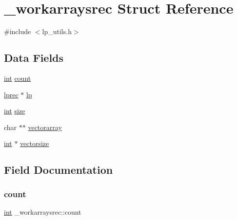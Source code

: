 \hypertarget{struct__workarraysrec}{}\section{\+\_\+workarraysrec Struct Reference}
\label{struct__workarraysrec}


{\ttfamily \#include $<$lp\+\_\+utils.\+h$>$}

\subsection*{Data Fields}
\begin{DoxyCompactItemize}
\item 
\hyperlink{lp__lib_8h_adeb9ec6400320e4923ac9d836d509ddb}{int} \hyperlink{struct__workarraysrec_a829ffa19e418e0bac01bf522b6117465}{count}
\item 
\hyperlink{lp__types_8h_afe42f1373b9ee8d824b5cad6a22d24c6}{lprec} $\ast$ \hyperlink{struct__workarraysrec_a0f30c1d980763462ed2cfae497a2ff9d}{lp}
\item 
\hyperlink{lp__lib_8h_adeb9ec6400320e4923ac9d836d509ddb}{int} \hyperlink{struct__workarraysrec_a0f980d0e3ae4b2f65ae77a59596fa381}{size}
\item 
char $\ast$$\ast$ \hyperlink{struct__workarraysrec_a5b2622e9a76d58140250ac939bf96810}{vectorarray}
\item 
\hyperlink{lp__lib_8h_adeb9ec6400320e4923ac9d836d509ddb}{int} $\ast$ \hyperlink{struct__workarraysrec_a20cbb8418fac1fe18a9725ba186e88e3}{vectorsize}
\end{DoxyCompactItemize}


\subsection{Field Documentation}
\mbox{\label{struct__workarraysrec_a829ffa19e418e0bac01bf522b6117465}} 
\subsubsection{\texorpdfstring{count}{count}}
{\footnotesize\ttfamily \hyperlink{lp__lib_8h_adeb9ec6400320e4923ac9d836d509ddb}{int} \+\_\+workarraysrec\+::count}

\mbox{\label{struct__workarraysrec_a0f30c1d980763462ed2cfae497a2ff9d}} 
